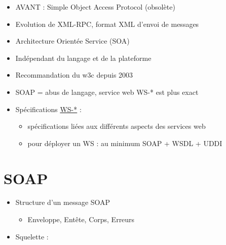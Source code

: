 \begin{itemize}
\tightlist
\item
  AVANT : Simple Object Access Protocol (obsolète)
\item
  Evolution de XML-RPC, format XML d'envoi de messages
\item
  Architecture Orientée Service (SOA)
\item
  Indépendant du langage et de la plateforme
\item
  Recommandation du w3c depuis 2003
\item
  SOAP = abus de langage, service web WS-* est plus exact
\item
  Spécifications
  \href{https://en.wikipedia.org/wiki/List_of_web_service_specifications}{WS-*}
  :

  \begin{itemize}
  \tightlist
  \item
    spécifications liées aux différents aspects des services web
  \item
    pour déployer un WS : au minimum SOAP + WSDL + UDDI
  \end{itemize}
\end{itemize}

\hypertarget{soap-1}{%
\section{SOAP}\label{soap-1}}

\begin{itemize}
\tightlist
\item
  Structure d'un message SOAP

  \begin{itemize}
  \tightlist
  \item
    Enveloppe, Entête, Corps, Erreurs
  \end{itemize}
\item
  Squelette :
\end{itemize}

\begin{english}

\begin{Shaded}
\begin{Highlighting}[]
\KeywordTok{\textgreater{}}
\end{Highlighting}
\end{Shaded}

\end{english}

